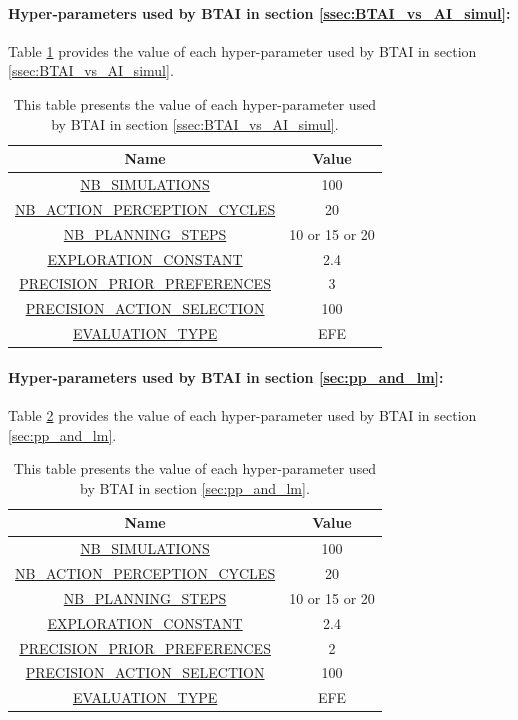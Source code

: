 \documentclass[twoside,11pt]{article}
\begin{document}
\paragraph{Hyper-parameters used by BTAI in section \ref{ssec:BTAI_vs_AI_simul}:}

Table \ref{tab:values_hp_ssec_BTAI_vs_AI_simul} provides the value of each hyper-parameter used by BTAI in section \ref{ssec:BTAI_vs_AI_simul}.

\begin{table}[H]
\centering
\begin{tabular}{ |c|c|  }
 \hline
 Name & Value\\
 \hline
 \hline
 \url{NB_SIMULATIONS} & 100\\
 \hline
 \url{NB_ACTION_PERCEPTION_CYCLES} & 20\\
 \hline
 \url{NB_PLANNING_STEPS} & 10 or 15 or 20\\
 \hline
 \url{EXPLORATION_CONSTANT} & 2.4\\
 \hline
 \url{PRECISION_PRIOR_PREFERENCES} & 3\\
 \hline
 \url{PRECISION_ACTION_SELECTION} & 100\\
 \hline
 \url{EVALUATION_TYPE} & EFE\\
 \hline
\end{tabular}
\caption{This table presents the value of each hyper-parameter used by BTAI in section \ref{ssec:BTAI_vs_AI_simul}.}
\label{tab:values_hp_ssec_BTAI_vs_AI_simul}
\end{table}

\paragraph{Hyper-parameters used by BTAI in section \ref{sec:pp_and_lm}:}

Table \ref{tab:values_hp_ssec_pp_and_lm} provides the value of each hyper-parameter used by BTAI in section \ref{sec:pp_and_lm}.

\begin{table}[H]
\centering
\begin{tabular}{ |c|c|  }
 \hline
 Name & Value\\
 \hline
 \hline
 \url{NB_SIMULATIONS} & 100\\
 \hline
 \url{NB_ACTION_PERCEPTION_CYCLES} & 20\\
 \hline
 \url{NB_PLANNING_STEPS} & 10 or 15 or 20\\
 \hline
 \url{EXPLORATION_CONSTANT} & 2.4\\
 \hline
 \url{PRECISION_PRIOR_PREFERENCES} & 2\\
 \hline
 \url{PRECISION_ACTION_SELECTION} & 100\\
 \hline
 \url{EVALUATION_TYPE} & EFE\\
 \hline
\end{tabular}
\caption{This table presents the value of each hyper-parameter used by BTAI in section \ref{sec:pp_and_lm}.}
\label{tab:values_hp_ssec_pp_and_lm}
\end{table}
\end{document}
